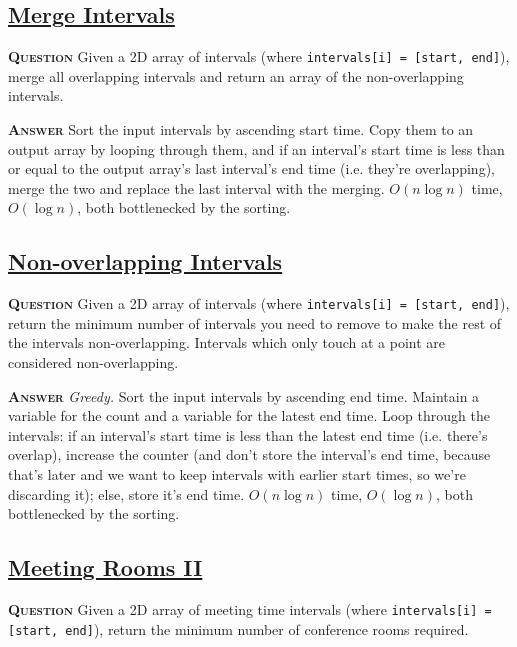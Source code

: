 \documentclass[table, xcdraw]{article}%
\begin{document}
\subsection{\href{https://leetcode.com/problems/merge-intervals}{Merge Intervals}}

\textsc{\textbf{Question}} Given a 2D array of intervals (where \texttt{intervals[i] = [start, end]}), merge all overlapping intervals and return an array of the non-overlapping intervals.

\textsc{\textbf{Answer}} Sort the input intervals by ascending start time. Copy them to an output array by looping through them, and if an interval's start time is less than or equal to the output array's last interval's end time (i.e. they're overlapping), merge the two and replace the last interval with the merging. $O(n \log n)$ time, $O(\log n)$, both bottlenecked by the sorting.

\subsection{\href{https://leetcode.com/problems/non-overlapping-intervals}{Non-overlapping Intervals}}

\textsc{\textbf{Question}} Given a 2D array of intervals (where \texttt{intervals[i] = [start, end]}), return the minimum number of intervals you need to remove to make the rest of the intervals non-overlapping. Intervals which only touch at a point are considered non-overlapping.

\textsc{\textbf{Answer}} \textit{Greedy.} Sort the input intervals by ascending end time. Maintain a variable for the count and a variable for the latest end time. Loop through the intervals: if an interval's start time is less than the latest end time (i.e. there's overlap), increase the counter (and don't store the interval's end time, because that's later and we want to keep intervals with earlier start times, so we're discarding it); else, store it's end time. $O(n \log n)$ time, $O(\log n)$, both bottlenecked by the sorting.

\subsection{\href{https://leetcode.com/problems/meeting-rooms-ii}{Meeting Rooms II}}

\textsc{\textbf{Question}} Given a 2D array of meeting time intervals (where \texttt{intervals[i] = [start, end]}), return the minimum number of conference rooms required.
\end{document}
